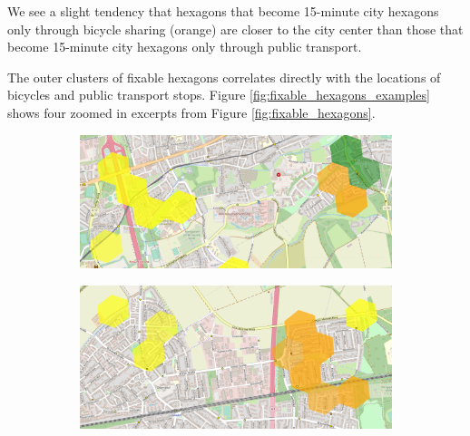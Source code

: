 We see a slight tendency that hexagons that become 15-minute city hexagons only through bicycle sharing (orange) are closer to the city center than those that become 15-minute city hexagons only through public transport. 

The outer clusters of fixable hexagons correlates directly with the locations of bicycles and public transport stops.
Figure \ref{fig:fixable_hexagons_examples} shows four zoomed in excerpts from Figure \ref{fig:fixable_hexagons}.

\begin{figure}
     \centering
     \begin{subfigure}[b]{0.45\textwidth}
         \centering
         \includegraphics[width=\textwidth]{Figures/results/problematic_hexagons/example_1.png}
     \end{subfigure}
     \hfill
     \begin{subfigure}[b]{0.45\textwidth}
         \centering
         \includegraphics[width=\textwidth]{Figures/results/problematic_hexagons/example_2.png}
     \end{subfigure}
     \hfill
     \begin{subfigure}[b]{0.45\textwidth}
         \centering

\end{subfigure}
\end{figure}
